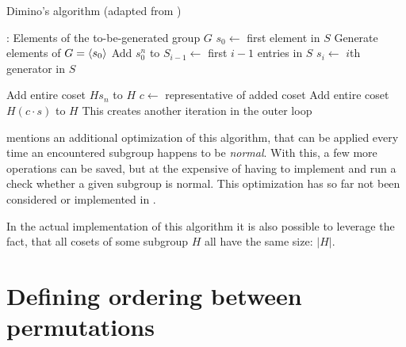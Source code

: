 \documentclass[parskip=half]{scrartcl}
\begin{document}
	\begin{algorithm}[!htb]
		\caption{Dimino's algorithm (adapted from \textcite{Butler1991a})}
		\label{alg:DiminoAlgorithm}

		\begin{algorithmic}[1]
				\State {}: Elements of the to-be-generated group $G$
				\State $s_0 \gets $ first element in $S$
				\Comment Generate elements of $G = \braket{s_0}$
					\State Add $s_0^n$ to 
				\EndFor
				\For{$i \in [1, $ size of $S) \wedge i \in \mathbb{N}$}
					\State $S_{i-1} \gets$ first $i - 1$ entries in $S$
					\State $s_i \gets$ $i$th generator in $S$
					\State {}
				\EndFor
			\EndFunction

					\State \Return
				\EndIf
				\State Add entire coset $H s_n$ to $H$
					\State $c \gets $ representative of added coset
							\State Add entire coset $H (c \cdot s)$ to $H$
							\Comment This creates another iteration in the outer loop
						\EndIf
					\EndFor
				\EndFor
			\EndFunction
		\end{algorithmic}
	\end{algorithm}

	\textcite{Butler1991a} mentions an additional optimization of this algorithm, that can be applied every time an encountered subgroup happens to be
	\emph{normal}. With this, a few more operations can be saved, but at the expensive of having to implement and run a check whether a given subgroup
	is normal. This optimization has so far not been considered or implemented in .

	In the actual implementation of this algorithm it is also possible to leverage the fact, that all cosets of some subgroup $H$ all have the same
	size: $|H|$.


	\section{Defining ordering between permutations}
	\label{sec:OrderPermutations}
\end{document}
